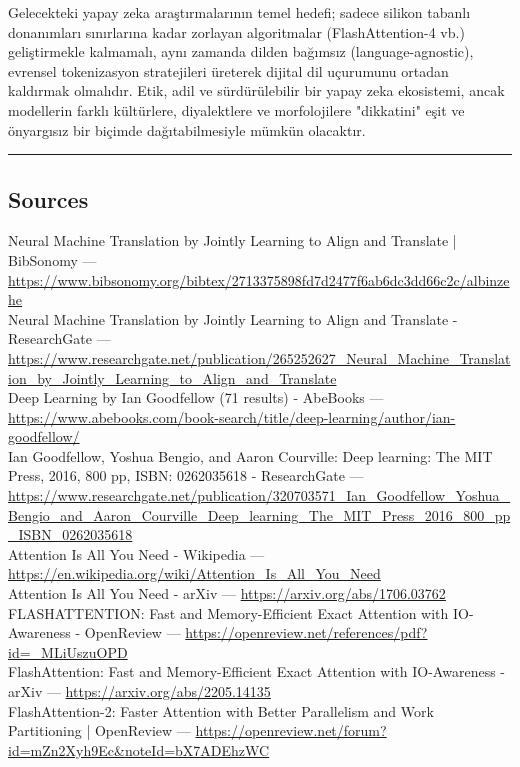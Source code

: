 \documentclass[11pt,a4paper]{article}
\begin{document}
Gelecekteki yapay zeka araştırmalarının temel hedefi; sadece silikon tabanlı donanımları sınırlarına kadar zorlayan algoritmalar (FlashAttention-4 vb.) geliştirmekle kalmamalı, aynı zamanda dilden bağımsız (language-agnostic), evrensel tokenizasyon stratejileri üreterek dijital dil uçurumunu ortadan kaldırmak olmalıdır. Etik, adil ve sürdürülebilir bir yapay zeka ekosistemi, ancak modellerin farklı kültürlere, diyalektlere ve morfolojilere "dikkatini" eşit ve önyargısız bir biçimde dağıtabilmesiyle mümkün olacaktır.


\bigskip
\noindent\rule{\textwidth}{0.4pt}
\subsection*{Sources}
\noindent [1] Neural Machine Translation by Jointly Learning to Align and Translate | BibSonomy --- \url{https://www.bibsonomy.org/bibtex/2713375898fd7d2477f6ab6dc3dd66c2c/albinzehe}\\
\noindent [4] Neural Machine Translation by Jointly Learning to Align and Translate - ResearchGate --- \url{https://www.researchgate.net/publication/265252627_Neural_Machine_Translation_by_Jointly_Learning_to_Align_and_Translate}\\
\noindent [5] Deep Learning by Ian Goodfellow (71 results) - AbeBooks --- \url{https://www.abebooks.com/book-search/title/deep-learning/author/ian-goodfellow/}\\
\noindent [6] Ian Goodfellow, Yoshua Bengio, and Aaron Courville: Deep learning: The MIT Press, 2016, 800 pp, ISBN: 0262035618 - ResearchGate --- \url{https://www.researchgate.net/publication/320703571_Ian_Goodfellow_Yoshua_Bengio_and_Aaron_Courville_Deep_learning_The_MIT_Press_2016_800_pp_ISBN_0262035618}\\
\noindent [8] Attention Is All You Need - Wikipedia --- \url{https://en.wikipedia.org/wiki/Attention_Is_All_You_Need}\\
\noindent [10] [1706.03762] Attention Is All You Need - arXiv --- \url{https://arxiv.org/abs/1706.03762}\\
\noindent [12] FLASHATTENTION: Fast and Memory-Efficient Exact Attention with IO-Awareness - OpenReview --- \url{https://openreview.net/references/pdf?id=_MLiUszuOPD}\\
\noindent [13] FlashAttention: Fast and Memory-Efficient Exact Attention with IO-Awareness - arXiv --- \url{https://arxiv.org/abs/2205.14135}\\
\noindent [16] FlashAttention-2: Faster Attention with Better Parallelism and Work Partitioning | OpenReview --- \url{https://openreview.net/forum?id=mZn2Xyh9Ec&noteId=bX7ADEhzWC}\\
\end{document}
